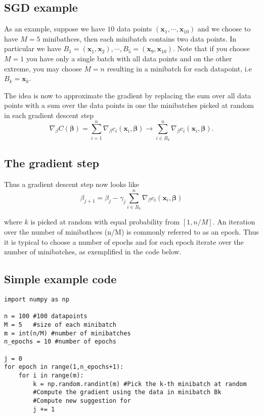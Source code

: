 \documentclass[%
oneside,                 %
final,                   %
10pt]{article}
\begin{document}
\subsection*{SGD example}
As an example, suppose we have $10$ data points $(\mathbf{x}_1,\cdots, \mathbf{x}_{10})$ 
and we choose to have $M=5$ minibathces,
then each minibatch contains two data points. In particular we have
$B_1 = (\mathbf{x}_1,\mathbf{x}_2), \cdots, B_5 =
(\mathbf{x}_9,\mathbf{x}_{10})$. Note that if you choose $M=1$ you
have only a single batch with all data points and on the other extreme,
you may choose $M=n$ resulting in a minibatch for each datapoint, i.e
$B_k = \mathbf{x}_k$.

The idea is now to approximate the gradient by replacing the sum over
all data points with a sum over the data points in one the minibatches
picked at random in each gradient descent step 
\[
\nabla_{\beta}
C(\mathbf{\beta}) = \sum_{i=1}^n \nabla_\beta c_i(\mathbf{x}_i,
\mathbf{\beta}) \rightarrow \sum_{i \in B_k}^n \nabla_\beta
c_i(\mathbf{x}_i, \mathbf{\beta}).
\]

\subsection*{The gradient step}

Thus a gradient descent step now looks like 
\[
\beta_{j+1} = \beta_j - \gamma_j \sum_{i \in B_k}^n \nabla_\beta c_i(\mathbf{x}_i,
\mathbf{\beta})
\]

where $k$ is picked at random with equal
probability from $[1,n/M]$. An iteration over the number of
minibathces (n/M) is commonly referred to as an epoch. Thus it is
typical to choose a number of epochs and for each epoch iterate over
the number of minibatches, as exemplified in the code below.

\subsection*{Simple example code}
















\begin{verbatim}
import numpy as np 

n = 100 #100 datapoints 
M = 5   #size of each minibatch
m = int(n/M) #number of minibatches
n_epochs = 10 #number of epochs

j = 0
for epoch in range(1,n_epochs+1):
    for i in range(m):
        k = np.random.randint(m) #Pick the k-th minibatch at random
        #Compute the gradient using the data in minibatch Bk
        #Compute new suggestion for 
        j += 1

\end{verbatim}
\end{document}
